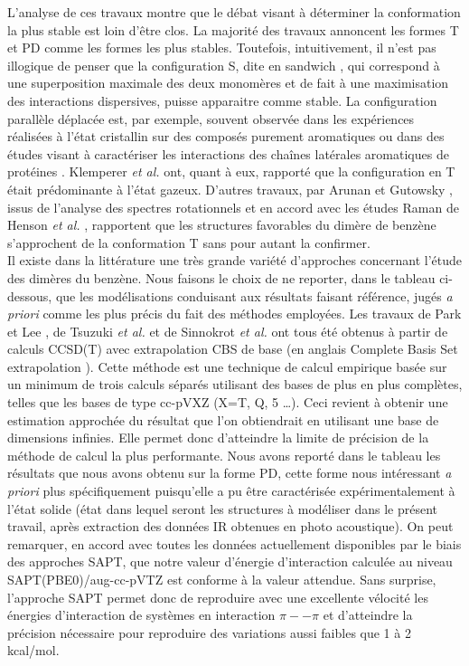 \documentclass[12pt,a4paper]{book}
\begin{document}
	L’analyse de ces travaux montre que le débat visant à déterminer la conformation la plus stable est loin d’être clos. La majorité des travaux annoncent les formes T et PD comme les formes les plus stables. Toutefois, intuitivement, il n'est pas illogique de penser que la configuration S, dite \og en sandwich \fg, qui correspond à une superposition maximale des deux monomères et de fait à une maximisation des interactions dispersives, puisse apparaitre comme stable. La configuration parallèle déplacée est, par exemple, souvent observée dans les expériences réalisées à l’état cristallin sur des composés purement aromatiques \cite{hunter1991pi,fyfe1997synthetic,rebek1996assembly} ou dans des études visant à caractériser les interactions des chaînes latérales aromatiques de protéines \cite{hunter1991pi,burley1985aromatic}. Klemperer \textit{et al.} \cite{janda1975benzene} ont, quant à eux, rapporté que la configuration en T était prédominante à l’état gazeux. D’autres travaux, par Arunan et Gutowsky \cite{arunan1993rotational}, issus de l'analyse des spectres rotationnels et en accord avec les études Raman de Henson \textit{et al.} \cite{henson1992raman}, rapportent que les structures favorables du dimère de benzène s’approchent de la conformation T sans pour autant la confirmer.\\ 
	
	
	Il existe dans la littérature une très grande variété d’approches concernant l’étude des dimères du benzène. Nous faisons le choix de ne reporter, dans le tableau ci-dessous, que les modélisations conduisant aux résultats faisant référence, jugés \textit{a priori} comme les plus précis du fait des méthodes employées. Les travaux de Park et Lee \cite{park2006accurate}, de Tsuzuki \textit{et al.} \cite{tsuzuki2002origin} et de Sinnokrot \textit{et al.} \cite{hobza1996potential} ont tous été obtenus à partir de calculs CCSD(T) avec extrapolation CBS de base (en anglais \og Complete Basis Set extrapolation \fg). Cette méthode est une technique de calcul empirique basée sur un minimum de trois calculs séparés utilisant des bases de plus en plus complètes, telles que les bases de type cc-pVXZ (X=T, Q, 5 …). Ceci revient à obtenir une estimation approchée du résultat que l'on obtiendrait en utilisant une base de dimensions infinies. Elle permet donc d’atteindre la limite de précision de la méthode de calcul la plus performante. Nous avons reporté dans le tableau les résultats que nous avons obtenu sur la forme PD, cette forme nous intéressant \textit{a priori} plus spécifiquement puisqu'elle a pu être caractérisée expérimentalement à l'état solide (état dans lequel seront les structures à modéliser dans le présent travail, après extraction des données IR obtenues en photo acoustique). On peut remarquer, en accord avec toutes les données actuellement disponibles par le biais des approches SAPT, que notre valeur d’énergie d’interaction calculée au niveau SAPT(PBE0)/aug-cc-pVTZ est conforme à la valeur attendue. Sans surprise, l’approche SAPT permet donc de reproduire avec une excellente vélocité les énergies d’interaction de systèmes en interaction $\pi--\pi$ et d’atteindre la précision nécessaire pour reproduire des variations aussi faibles que 1 à 2 kcal/mol.
	
\end{document}
